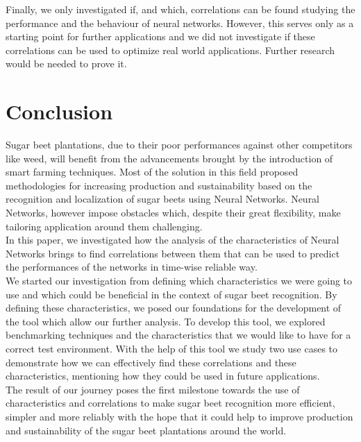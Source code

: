 Finally, we only investigated if, and which, correlations can be found studying the performance and the behaviour of neural networks. However, this serves only as a starting point for further applications and we did not investigate if these correlations can be used to optimize real world applications. Further research would be needed to prove it. 

\section{Conclusion}
Sugar beet plantations, due to their poor performances against other competitors like weed, will benefit from the advancements brought by the introduction of smart farming techniques. Most of the solution in this field proposed methodologies for increasing production and sustainability based on the recognition and localization of sugar beets using Neural Networks. Neural Networks, however impose obstacles which, despite their great flexibility, make tailoring application around them challenging.\\ 
In this paper, we investigated how the analysis of the characteristics of Neural Networks brings to find correlations between them that can be used to predict the performances of the networks in time-wise reliable way.\\
We started our investigation from defining which characteristics we were going to use and which could be beneficial in the context of sugar beet recognition. By defining these characteristics, we posed our foundations for the development of the tool which allow our further analysis. To develop this tool, we explored benchmarking techniques and the characteristics that we would like to have for a correct test environment. With the help of this tool we study two use cases to demonstrate how we can effectively find these correlations and these characteristics, mentioning how they could be used in future applications. \\
The result of our journey poses the first milestone towards the use of characteristics and correlations to make sugar beet recognition more efficient, simpler and more reliably with the hope that it could help to improve production and sustainability of the sugar beet plantations around the world. 